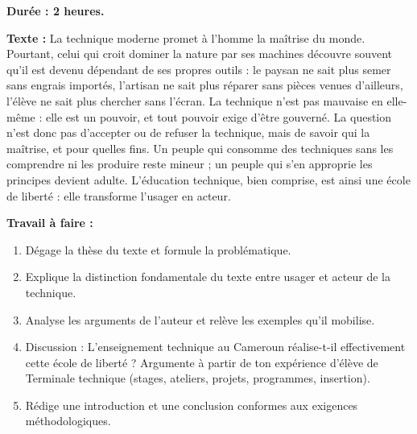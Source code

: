 \documentclass[11pt]{article}
\begin{document}
\begin{exercice}
\textbf{Durée : 2 heures.}

\textbf{Texte :} \og La technique moderne promet à l'homme la maîtrise du monde. Pourtant, celui qui croit dominer la nature par ses machines découvre souvent qu'il est devenu dépendant de ses propres outils : le paysan ne sait plus semer sans engrais importés, l'artisan ne sait plus réparer sans pièces venues d'ailleurs, l'élève ne sait plus chercher sans l'écran. La technique n'est pas mauvaise en elle-même : elle est un pouvoir, et tout pouvoir exige d'être gouverné. La question n'est donc pas d'accepter ou de refuser la technique, mais de savoir qui la maîtrise, et pour quelles fins. Un peuple qui consomme des techniques sans les comprendre ni les produire reste mineur ; un peuple qui s'en approprie les principes devient adulte. L'éducation technique, bien comprise, est ainsi une école de liberté : elle transforme l'usager en acteur. \fg

\textbf{Travail à faire :}
\begin{enumerate}
\item Dégage la thèse du texte et formule la problématique.
\item Explique la distinction fondamentale du texte entre \og usager \fg et \og acteur \fg de la technique.
\item Analyse les arguments de l'auteur et relève les exemples qu'il mobilise.
\item Discussion : L'enseignement technique au Cameroun réalise-t-il effectivement cette \og école de liberté \fg ? Argumente à partir de ton expérience d'élève de Terminale technique (stages, ateliers, projets, programmes, insertion).
\item Rédige une introduction et une conclusion conformes aux exigences méthodologiques.
\end{enumerate}
\end{exercice}
\end{document}
